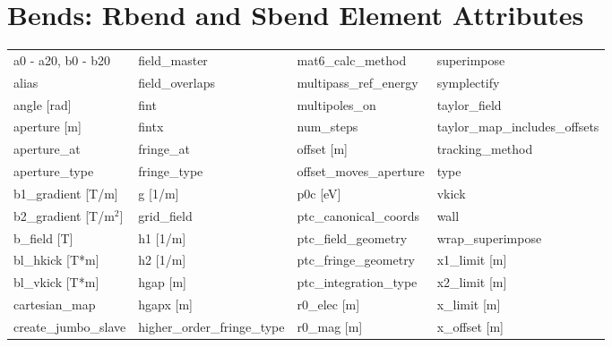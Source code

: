  \section{Bends: Rbend and Sbend Element Attributes}
 \label{s:list.bend}
 
 \begin{tabular}{llll} \toprule
a0 - a20, b0 - b20               & field_master                     & mat6_calc_method                 & superimpose                      \\
alias                            & field_overlaps                   & multipass_ref_energy             & symplectify                      \\
angle [rad]                      & fint                             & multipoles_on                    & taylor_field                     \\
aperture [m]                     & fintx                            & num_steps                        & taylor_map_includes_offsets      \\
aperture_at                      & fringe_at                        & offset [m]                       & tracking_method                  \\
aperture_type                    & fringe_type                      & offset_moves_aperture            & type                             \\
b1_gradient [T/m]                & g [1/m]                          & p0c [eV]                         & vkick                            \\
b2_gradient [T/m$^2$]            & grid_field                       & ptc_canonical_coords             & wall                             \\
b_field [T]                      & h1 [1/m]                         & ptc_field_geometry               & wrap_superimpose                 \\
bl_hkick [T*m]                   & h2 [1/m]                         & ptc_fringe_geometry              & x1_limit [m]                     \\
bl_vkick [T*m]                   & hgap [m]                         & ptc_integration_type             & x2_limit [m]                     \\
cartesian_map                    & hgapx [m]                        & r0_elec [m]                      & x_limit [m]                      \\
create_jumbo_slave               & higher_order_fringe_type         & r0_mag [m]                       & x_offset [m]                     \\

\end{tabular}
